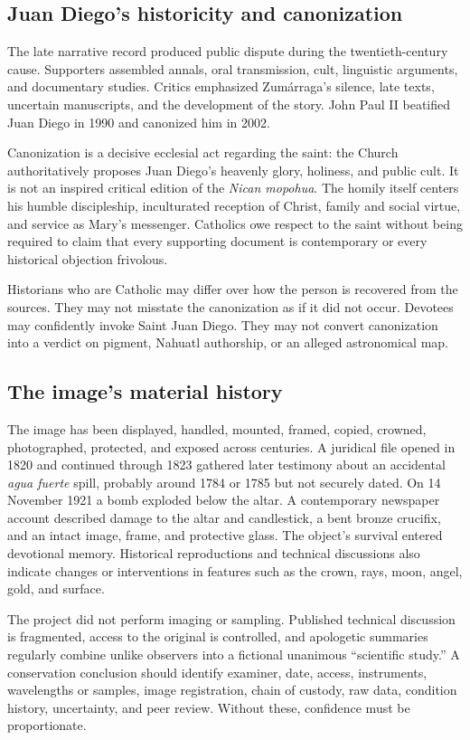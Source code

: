 \subsection{Juan Diego's historicity and canonization}

The late narrative record produced public dispute during the twentieth-century cause. Supporters assembled annals, oral transmission, cult, linguistic arguments, and documentary studies. Critics emphasized Zumárraga's silence, late texts, uncertain manuscripts, and the development of the story. John Paul II beatified Juan Diego in 1990 and canonized him in 2002.

Canonization is a decisive ecclesial act regarding the saint: the Church authoritatively proposes Juan Diego's heavenly glory, holiness, and public cult. It is not an inspired critical edition of the \emph{Nican mopohua}. The homily itself centers his humble discipleship, inculturated reception of Christ, family and social virtue, and service as Mary's messenger. Catholics owe respect to the saint without being required to claim that every supporting document is contemporary or every historical objection frivolous.

Historians who are Catholic may differ over how the person is recovered from the sources. They may not misstate the canonization as if it did not occur. Devotees may confidently invoke Saint Juan Diego. They may not convert canonization into a verdict on pigment, Nahuatl authorship, or an alleged astronomical map.

\subsection{The image's material history}

The image has been displayed, handled, mounted, framed, copied, crowned, photographed, protected, and exposed across centuries. A juridical file opened in 1820 and continued through 1823 gathered later testimony about an accidental \emph{agua fuerte} spill, probably around 1784 or 1785 but not securely dated. On 14 November 1921 a bomb exploded below the altar. A contemporary newspaper account described damage to the altar and candlestick, a bent bronze crucifix, and an intact image, frame, and protective glass. The object's survival entered devotional memory. Historical reproductions and technical discussions also indicate changes or interventions in features such as the crown, rays, moon, angel, gold, and surface.

The project did not perform imaging or sampling. Published technical discussion is fragmented, access to the original is controlled, and apologetic summaries regularly combine unlike observers into a fictional unanimous “scientific study.” A conservation conclusion should identify examiner, date, access, instruments, wavelengths or samples, image registration, chain of custody, raw data, condition history, uncertainty, and peer review. Without these, confidence must be proportionate.


